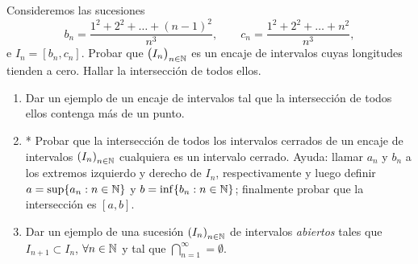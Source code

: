 \item Consideremos las sucesiones
\[
b_n = \frac{1^2+2^2 + \dots + (n-1)^2}{n^3},
\qquad
c_n = \frac{1^2+2^2 + \dots + n^2}{n^3},
\]
e $I_n = [b_n,c_n]$.  Probar que $\big( I_n \big)_{n\in\mathbb{N}}$ es un encaje de intervalos cuyas longitudes tienden a cero. Hallar la intersección de todos ellos.

\item \begin{enumerate}
    \item 
Dar un ejemplo de un encaje de intervalos tal que la intersección de todos ellos contenga más de un punto.
\item* Probar que la intersección de todos los intervalos cerrados de un encaje de intervalos $\left(I_n\right)_{{n\in\mathbb{N}}}$ cualquiera es un intervalo cerrado. Ayuda: llamar $a_n$ y $b_n$ a los extremos izquierdo y derecho de $I_n$, respectivamente y luego definir $a = \sup \{a_n:{n\in\mathbb{N}}\}$ y $b = \inf\{b_n:{n\in\mathbb{N}}\}$; finalmente probar que la intersección es $[a,b]$.

\item Dar un ejemplo de una sucesión $\left(I_n\right)_{{n\in\mathbb{N}}}$ de intervalos \emph{abiertos} tales que $I_{n+1}\subset I_n$, $\forall{\ensuremath{n\in\mathbb{N}}}$ y tal que $\bigcap_{n=1}^\infty = \emptyset.$
\end{enumerate}
